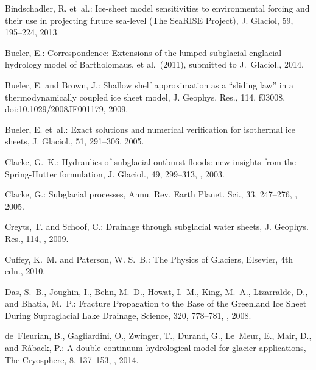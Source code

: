 \documentclass[gmd]{copernicus}   %
\providecommand{\DIFaddbegin}{} %
\providecommand{\DIFaddend}{} %
\providecommand{\DIFdelbegin}{} %
\providecommand{\DIFdelend}{} %
\begin{document}
\begin{thebibliography}{}
\DIFdelbegin %
\DIFdelend \DIFaddbegin {}
\DIFaddend Bindschadler, R. et~al.: Ice-sheet model sensitivities to environmental forcing
  and their use in projecting future sea-level ({T}he {S}ea{RISE} {P}roject),
  J. Glaciol, 59, 195--224, 2013.

Bueler, E.: Correspondence: Extensions of the lumped subglacial-englacial
  hydrology model of {B}artholomaus, et al.~(2011), submitted to J.~Glaciol.,
  2014.

Bueler, E. and Brown, J.: Shallow shelf approximation as a ``sliding law'' in a
  thermodynamically coupled ice sheet model, J. Geophys. Res., 114, f03008,
  doi:10.1029/2008JF001179, 2009.

Bueler, E. et~al.: Exact solutions and numerical verification for isothermal ice sheets,
  J. Glaciol., 51, 291--306, 2005.

Clarke, G.~K.: Hydraulics of subglacial outburst floods: new insights from the
  {Spring-Hutter} formulation, J. Glaciol., 49, 299--313,
  , 2003.

Clarke, G.: Subglacial processes, Annu. Rev. Earth Planet. Sci., 33,
  247--276, , 2005.

Creyts, T. and Schoof, C.: Drainage through subglacial water sheets, J.
  Geophys. Res., 114, , 2009.

Cuffey, K.~M. and Paterson, W. S.~B.: The {P}hysics of {G}laciers, Elsevier,
  4th edn., 2010.

Das, S.~B., Joughin, I., Behn, M.~D., Howat, I.~M., King, M.~A., Lizarralde,
  D., and Bhatia, M.~P.: {Fracture Propagation to the Base of the Greenland Ice
  Sheet During Supraglacial Lake Drainage}, Science, 320, 778--781,
  , 2008.

de~Fleurian, B., Gagliardini, O., Zwinger, T., Durand, G., Le~Meur, E., Mair,
  D., and R{\aa}back, P.: A double continuum hydrological model for glacier
  applications, The Cryosphere, 8, 137--153, , 2014.


\end{thebibliography}
\end{document}
